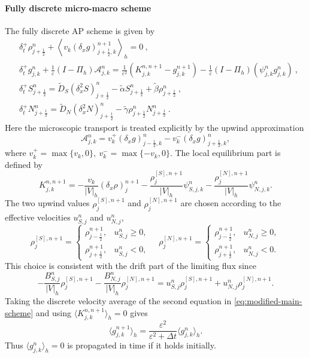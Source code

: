 \documentclass[11pt,twoside]{article}
\numberwithin{equation}{section}
\theoremstyle{plain}
\theoremstyle{nonumberplain}
\begin{document}
{{\paragraph{Fully discrete micro-macro scheme}
The fully discrete AP scheme is given by
\begin{subequations}\label{eq:modified-main-scheme}
\begin{align}
&
\delta_t^+\rho_{j+\frac12}^n
+
\left\langle
v_k(\delta_x g)_{j+\frac12,k}^{n+1}
\right\rangle_h
=0\ ,\label{eq:modified-main-scheme1}
\\[1mm]
&
\delta_t^+ g_{j,k}^n
+
\frac1\varepsilon
(I-\Pi_h)\mathcal A_{j,k}^n
=
\frac1{\varepsilon^2}
\left(
K_{j,k}^{n,n+1}
-
g_{j,k}^{n+1}
\right)
-
\frac1\varepsilon
(I-\Pi_h)(\psi_{j,k}^n g_{j,k}^n)\ ,\label{eq:modified-main-scheme2}
\\[1mm]
&
\delta_t^+S_{j+\frac12}^{n}
=
\widetilde D_S(\delta_x^2S)_{j+\frac12}^{n}
-\widetilde\alpha S_{j+\frac12}^{n}
+\widetilde\beta\rho_{j+\frac12}^{n}\ ,\label{eq:modified-main-scheme3}
\\[1mm]
&
\delta_t^+N_{j+\frac12}^{n}
=
\widetilde D_N(\delta_x^2N)_{j+\frac12}^{n}
-\widetilde\gamma\rho_{j+\frac12}^{n}N_{j+\frac12}^{n}\ .\label{eq:modified-main-scheme4}
\end{align}
\end{subequations}
Here the microscopic transport is treated explicitly by the upwind
approximation
\[
\mathcal A_{j,k}^n
=
v_k^+(\delta_x g)_{j-\frac12,k}^{n}
-
v_k^-(\delta_x g)_{j+\frac12,k}^{n},
\]
where
$
v_k^+=\max\{v_k,0\},
\
v_k^-=\max\{-v_k,0\}.
$
The local equilibrium part is defined by
\begin{equation}\label{eq:modified-K-two-upwind}
K_{j,k}^{n,n+1}
=
-\frac{v_k}{|V|_h}(\delta_x\rho)_j^{n+1}
-
\frac{\rho_j^{[S],n+1}}{|V|_h}\psi_{S,j,k}^n
-
\frac{\rho_j^{[N],n+1}}{|V|_h}\psi_{N,j,k}^n .
\end{equation}
The two upwind values $\rho_j^{[S],n+1}$ and $\rho_j^{[N],n+1}$ are chosen according to the effective velocities
\(u_{S,j}^n\) and \(u_{N,j}^n\),
\begin{equation}\label{eq: upwind densities}
\rho_j^{[S],n+1}
=
\begin{cases}
\rho_{j-\frac12}^{n+1}, & u_{S,j}^n\ge 0,\\
\rho_{j+\frac12}^{n+1}, & u_{S,j}^n<0,
\end{cases}
\quad 
\rho_j^{[N],n+1}
=
\begin{cases}
\rho_{j-\frac12}^{n+1}, & u_{N,j}^n\ge 0,\\
\rho_{j+\frac12}^{n+1}, & u_{N,j}^n<0.
\end{cases}
\end{equation}
This choice is consistent with the drift part of the limiting flux since
\[
-\frac{B_{S,j}^n}{|V|_h}\rho_j^{[S],n+1}
-
\frac{B_{N,j}^n}{|V|_h}\rho_j^{[N],n+1}
=
u_{S,j}^n\rho_j^{[S],n+1}
+
u_{N,j}^n\rho_j^{[N],n+1}.
\]
Taking the
discrete velocity average of the second equation in
\eqref{eq:modified-main-scheme} and using
$
\langle K_{j,k}^{n,n+1}\rangle_h=0
$
gives
\[
\langle g_{j,k}^{n+1}\rangle_h
=
\frac{\varepsilon^2}{\varepsilon^2+\Delta t}
\langle g_{j,k}^{n}\rangle_h .
\]
Thus \(\langle g_{j,k}^{n}\rangle_h=0\) is propagated in time if it holds
initially.

}}
\end{document}
